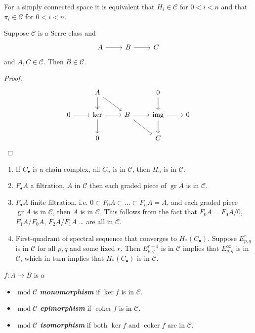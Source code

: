 \documentclass{article}
\newcommand{\Cc}{\mathcal{C}}
\DeclareMathOperator{\img}{img}
\DeclareMathOperator{\coker}{coker}
\DeclareMathOperator{\gr}{gr}
\renewcommand{\mod}{\operatorname{mod}}
\begin{document}
\begin{claim}
	For a simply connected space it is equivalent that $H_i\in\Cc$ for $0<i<n$ and that $\pi_i\in\Cc$ for $0<i<n$.
\end{claim}
\begin{prop}
	Suppose $\Cc$ is a Serre class and
\[\begin{tikzcd}
	A\arrow[r]&B\arrow[r]&C
\end{tikzcd}\]
and $A,C\in\Cc$. Then $B\in\Cc$.
\end{prop}
\begin{proof}
	\[\begin{tikzcd}
		&A\arrow[d,two heads]\arrow[dr]&&0\arrow[d]\\
		0\arrow[r]&\ker\arrow[r]\arrow[d]&B\arrow[rd]\arrow[r]&\img\arrow[d]\arrow[r]&0\\
		&0&&C
	\end{tikzcd}\]
\end{proof}
\begin{remark}\leavevmode
	\begin{enumerate}
		\item If $C_\bullet$ is a chain complex, all $C_n$ is in $\Cc$, then $H_n$ is in $\Cc$.
		\item $F_\bullet A$ a filtration, $A$ in $\Cc$ then each graded piece of $\gr A$ is in $\Cc$.
		\item $F_\bullet A$ finite filtration, i.e. $0\subset F_0A\subset \ldots\subset F_nA=A$, and each graded piece $\gr A$ is in $\Cc$, then $A$ is in $\Cc$. This follows from the fact that $F_0A=F_0A/0$, $F_1A/F_0A$, $F_2A/F_1A$ … are all in $\Cc$.
		\item First-quadrant of spectral sequence that converges to $H_*(C_\bullet)$. Suppose $E^r_{p,q}$ is in $\Cc$ for all $p,q$ and some fixed $r$. Then $E^{r+1}_{p,q}$ is in $\Cc$ implies that $E^\infty_{p,q}$ is in $\Cc$, which in turn implies that $H_*(C_\bullet)$ is in $\Cc$.
	\end{enumerate}
\end{remark}
\begin{defn}$f:A\to B$ is a
	\begin{itemize}
		\item  \textbf{$\mod\Cc$ \textit{monomorphism}} if $\ker f$ is in $\Cc$.
		\item \textbf{\textit{$\mod\Cc$ epimorphism}} if $\coker f$ is in $\Cc$.
		\item \textbf{\textit{$\mod\Cc$ isomorphism}} if both $\ker f$ and $\coker f$ are in $\Cc$.
	\end{itemize}
\end{defn}
\end{document}
